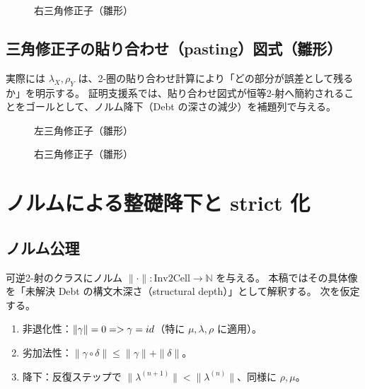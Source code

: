 \documentclass[a4paper,11pt]{article}
\begin{document}
\begin{figure}[ht]
\centering
{}
\caption{右三角修正子（雛形）}
\end{figure}

\subsection{三角修正子の貼り合わせ（pasting）図式（雛形）}
\begin{remark}
実際には $\lambda_X,\rho_Y$ は、2-圏の貼り合わせ計算により「どの部分が誤差として残るか」を明示する。
証明支援系では、貼り合わせ図式が恒等2-射へ簡約されることをゴールとして、ノルム降下（Debt の深さの減少）を補題列で与える。
\end{remark}

\begin{figure}[ht]
\centering
{}
\caption{左三角修正子（雛形）}
\end{figure}

\begin{figure}[ht]
\centering
{}
\caption{右三角修正子（雛形）}
\end{figure}

\section{ノルムによる整礎降下と strict 化}
\subsection{ノルム公理}
\begin{definition}[離散ノルム（公理）]
可逆2-射のクラスにノルム $\|\cdot\|:\mathrm{Inv2Cell}\to\mathbb{N}$ を与える。
本稿ではその具体像を「未解決 Debt の構文木深さ（structural depth）」として解釈する。
次を仮定する。
\begin{enumerate}
  \item 非退化性：$\|\gamma\|=0 => \gamma=id$（特に $\mu,\lambda,\rho$ に適用）。
  \item 劣加法性：$\|\gamma\circ\delta\|\le \|\gamma\|+\|\delta\|$。
  \item 降下：反復ステップで $\|\lambda^{(n+1)}\|<\|\lambda^{(n)}\|$、同様に $\rho,\mu$。
\end{enumerate}
\end{definition}
\end{document}

